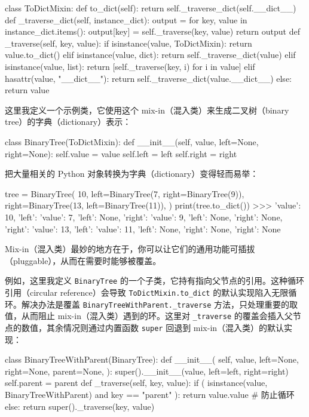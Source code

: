 \begin{codebox}[python]
class ToDictMixin:
    def to_dict(self):
        return self._traverse_dict(self.__dict__)
    def _traverse_dict(self, instance_dict):
        output = {}
        for key, value in instance_dict.items():
            output[key] = self._traverse(key, value)
        return output
    def _traverse(self, key, value):
        if isinstance(value, ToDictMixin):
            return value.to_dict()
        elif isinstance(value, dict):
            return self._traverse_dict(value)
        elif isinstance(value, list):
            return [self._traverse(key, i) for i in value]
        elif hasattr(value, "__dict__"):
            return self._traverse_dict(value.__dict__)
        else:
            return value
\end{codebox}

这里我定义一个示例类，它使用这个 mix-in（混入类）来生成二叉树（binary tree）的字典（dictionary）表示：

\begin{codebox}[python]
class BinaryTree(ToDictMixin):
    def __init__(self, value, left=None, right=None):
        self.value = value
        self.left = left
        self.right = right
\end{codebox}

把大量相关的 Python 对象转换为字典（dictionary）变得轻而易举：

\begin{codebox}[python]
tree = BinaryTree(
    10,
    left=BinaryTree(7, right=BinaryTree(9)),
    right=BinaryTree(13, left=BinaryTree(11)),
)
print(tree.to_dict())
>>>
{'value': 10,
 'left': {'value': 7,
          'left': None,
          'right': {'value': 9, 'left': None, 'right': None}},
 'right': {'value': 13,
           'left': {'value': 11, 'left': None, 'right': None},
           'right': None}}
\end{codebox}

Mix-in（混入类）最妙的地方在于，你可以让它们的通用功能可插拔（pluggable），从而在需要时能够被覆盖。

例如，这里我定义 \texttt{BinaryTree} 的一个子类，它持有指向父节点的引用。这种循环引用（circular reference）会导致 \texttt{ToDictMixin.to\_dict} 的默认实现陷入无限循环。解决办法是覆盖 \texttt{BinaryTreeWithParent.\_traverse} 方法，只处理重要的取值，从而阻止 mix-in（混入类）遇到的环。这里对 \texttt{\_traverse} 的覆盖会插入父节点的数值，其余情况则通过内置函数 \texttt{super} 回退到 mix-in（混入类）的默认实现：

\begin{codebox}[python]
class BinaryTreeWithParent(BinaryTree):
    def __init__(
        self,
        value,
        left=None,
        right=None,
        parent=None,
    ):
        super().__init__(value, left=left, right=right)
        self.parent = parent
    def _traverse(self, key, value):
        if (
            isinstance(value, BinaryTreeWithParent)
            and key == "parent"
        ):
            return value.value  # 防止循环
        else:
            return super()._traverse(key, value)
\end{codebox}

